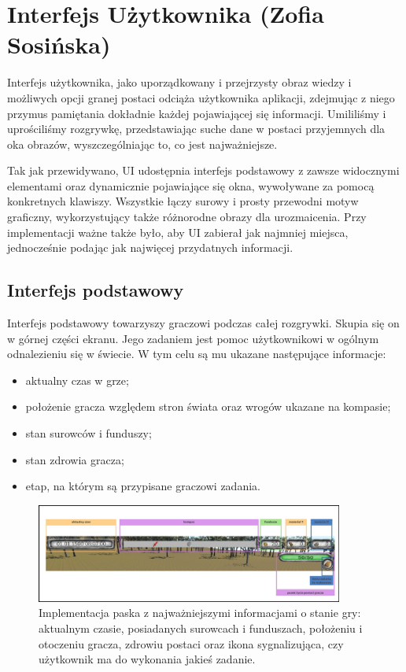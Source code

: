 \section{Interfejs Użytkownika (Zofia Sosińska)}\label{chap:ui_imp}
Interfejs użytkownika, jako uporządkowany i przejrzysty obraz wiedzy i możliwych opcji granej postaci odciąża użytkownika
aplikacji, zdejmując z niego przymus pamiętania dokładnie każdej pojawiającej się informacji. Umililiśmy i uprościliśmy 
rozgrywkę, przedstawiając suche dane w postaci przyjemnych dla oka obrazów, wyszczególniając to, co jest najważniejsze.

Tak jak przewidywano, UI udostępnia interfejs podstawowy z zawsze widocznymi elementami oraz dynamicznie pojawiające się okna, wywoływane za pomocą konkretnych klawiszy.
Wszystkie łączy surowy i prosty przewodni motyw graficzny, wykorzystujący także różnorodne obrazy dla urozmaicenia. Przy implementacji ważne także było, aby UI zabierał
jak najmniej miejsca, jednocześnie podając jak najwięcej przydatnych informacji.

\subsection{Interfejs podstawowy}
Interfejs podstawowy towarzyszy graczowi podczas całej rozgrywki. Skupia się on w górnej części ekranu. Jego zadaniem jest pomoc 
użytkownikowi w ogólnym odnalezieniu się w świecie. W tym celu są mu ukazane następujące informacje:
\begin{itemize}
    \item aktualny czas w grze;
    \item położenie gracza względem stron świata oraz wrogów ukazane na kompasie;
    \item stan surowców i funduszy;
    \item stan zdrowia gracza;
    \item etap, na którym są przypisane graczowi zadania.
\end{itemize}

\begin{figure}[htbp]
    \centering
    \includegraphics[width=0.9\textwidth]{images/ui/naszpasek.png}
    \caption{Implementacja paska z najważniejszymi informacjami o stanie gry: aktualnym czasie, posiadanych surowcach 
    i funduszach, położeniu i otoczeniu gracza, zdrowiu postaci oraz ikona sygnalizująca, czy użytkownik ma do wykonania jakieś zadanie.
    }\label{fig:naszpasek}
\end{figure}


